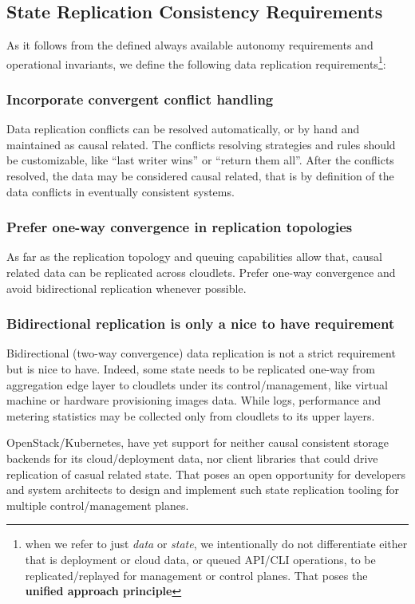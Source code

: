 \documentclass[conference]{IEEEtran}
\begin{document}
\subsection{State Replication Consistency Requirements}
As it follows from the defined always available autonomy requirements and
operational invariants, we define the following data replication
requirements\footnote{when we refer to just \textit{data} or \textit{state}, we
intentionally do not differentiate either that is deployment or cloud data, or
queued API/CLI operations, to be replicated/replayed for management or control
planes. That poses the \textbf{unified approach principle}}:

\subsubsection{Incorporate convergent conflict handling\cite{b1}}
Data replication conflicts can be resolved automatically, or by hand and
maintained as causal related. The conflicts resolving strategies and rules
should be customizable, like ``last writer wins'' or ``return them all''. After
the conflicts resolved, the data may be considered causal related, that is by
definition\cite{b1} of the data conflicts in eventually consistent systems.

\subsubsection{Prefer one-way convergence in replication topologies}
As far as the replication topology and queuing capabilities allow
that, causal related data can be replicated across cloudlets. Prefer one-way
convergence and avoid bidirectional replication whenever possible.

\subsubsection{Bidirectional replication is only a nice to have requirement}
Bidirectional (two-way convergence) data replication is not a strict
requirement but is nice to have. Indeed, some state needs to be replicated
one-way from aggregation edge layer to cloudlets under its control/management,
like virtual machine or hardware provisioning images data. While logs,
performance and metering statistics may be collected only from cloudlets to its
upper layers.

OpenStack/Kubernetes, have yet support for neither causal consistent storage
backends for its cloud/deployment data, nor client libraries that could drive
replication of casual related state. That poses an open opportunity for
developers and system architects to design and implement such state replication
tooling for multiple control/management planes.
\end{document}
